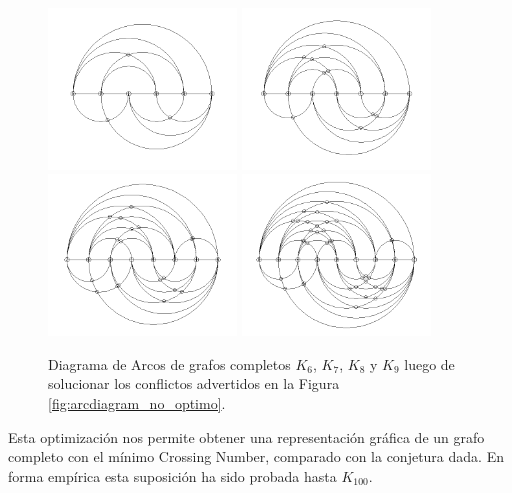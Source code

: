 	\begin{figure}[h]
		\centering
		\includegraphics[width=5cm]{imagenes/grafo_1_bn_opt.png}
		\includegraphics[width=5cm]{imagenes/grafo_2_bn_opt.png}\\
		\includegraphics[width=5cm]{imagenes/grafo_3_bn_opt.png}
		\includegraphics[width=5cm]{imagenes/grafo_4_bn_opt.png}
		\caption{Diagrama de Arcos de grafos completos $K_6$, $K_7$, $K_8$ y $K_9$ luego de solucionar los conflictos advertidos en la Figura \ref{fig:arcdiagram_no_optimo}.}
		\label{fig:arcdiagram_optimo}
	\end{figure}
	
	
	Esta optimización nos permite obtener  una representación gráfica de un grafo completo con el mínimo Crossing Number, comparado con la conjetura dada. En forma empírica esta suposición ha sido probada hasta $K_{100}$.
	
